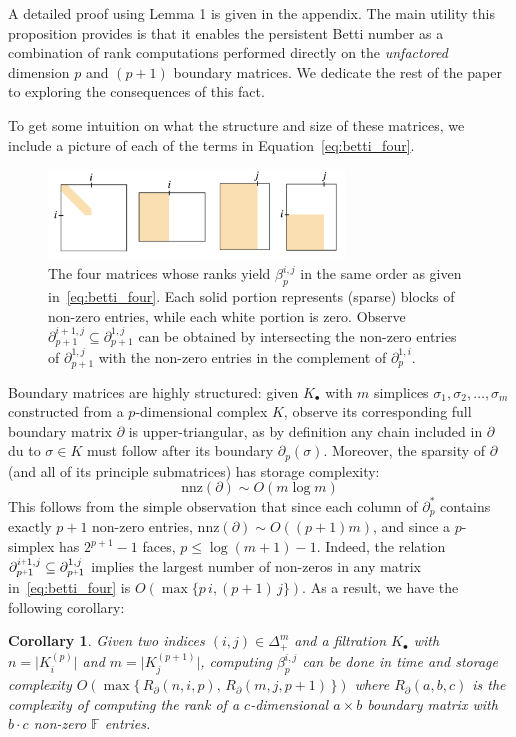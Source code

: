 \documentclass[10pt]{article}
\newcommand{\+}{%
	\raisebox{0.18ex}{\scaleobj{0.55}{+}}
}
\newtheorem{corollary}{Corollary}
\begin{document}
\noindent A detailed proof using Lemma 1 is given in the appendix. The main utility this proposition provides is that it enables the persistent Betti number as a combination of rank computations performed directly on the \emph{unfactored} dimension $p$ and $(p+1)$ boundary matrices. We dedicate the rest of the paper to exploring the consequences of this fact. 

To get some intuition on what the structure and size of these matrices, we include a picture of each of the terms in Equation~\eqref{eq:betti_four}. 
\begin{figure}[!h]
	\centering
	\includegraphics[width=0.70\textwidth]{four_matrices}
	\caption{The four matrices whose ranks yield $\beta_p^{i,j}$ in the same order as given in~\eqref{eq:betti_four}. Each solid portion represents (sparse) blocks of non-zero entries, while each white portion is zero. Observe $\partial_{p+1}^{i+1, j} \subseteq \partial_{p+1}^{1,j}$ can be obtained by intersecting the non-zero entries of $\partial_{p+1}^{1,j}$ with the non-zero entries in the complement of $\partial_p^{1,i}$.  }
\end{figure}
Boundary matrices are highly structured: given $K_\bullet$ with $m$ simplices $\sigma_1, \sigma_2, \dots, \sigma_m$ constructed from a $p$-dimensional complex $K$, observe its corresponding full boundary matrix $\partial$ is upper-triangular, as by definition any chain included in $\partial$ du to $\sigma \in K$ must follow after its boundary $\partial_p(\sigma)$. Moreover, the sparsity of $\partial$ (and all of its principle submatrices) has storage complexity: 
\begin{equation}
	\mathrm{nnz}(\partial) \sim O(m \log m)
\end{equation} 
This follows from the simple observation that since each column of $\partial_p^\ast$ contains exactly $p+1$ non-zero entries, $\mathrm{nnz}(\partial) \sim O((p+1)m)$, and since a $p$-simplex has $2^{p+1} - 1$ faces, $p \leq \log(m + 1) - 1$. 
Indeed, the relation $\partial_{p\+1}^{i \+ 1, j} \subseteq \partial_{p\+1}^{1, j}$ implies the largest number of non-zeros in any matrix in~\eqref{eq:betti_four} is $O(\max\{p\, i, (p+1)\,j\})$.
As a result, we have the following corollary:
\begin{corollary}
	Given two indices $(i,j) \in \Delta_+^m$ and a filtration $K_\bullet$ with $n = \lvert K_{i}^{(p)} \rvert$ and $m = \lvert K_{j}^{(p+1)} \rvert$, computing $\beta_p^{i,j}$ can be done in time and storage complexity $O(\max \{\, R_\partial(n, i, p), \, R_\partial(m, j, p+1) \,\})$ where $R_\partial(a,b,c)$ is the complexity of computing the rank of a $c$-dimensional $a\times b$ boundary matrix with $b\cdot c$ non-zero $\mathbb{F}$ entries. 
\end{corollary} 
\end{document}

